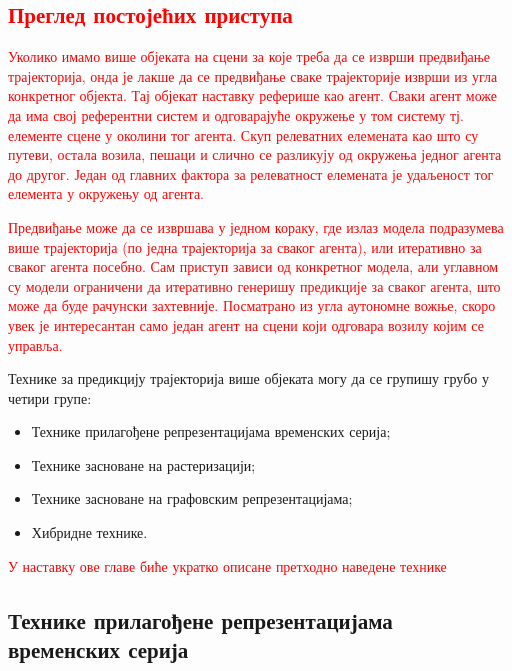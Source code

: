 \documentclass[11pt,oneside]{memoir}
\begin{document}
\textcolor{red}{\chapter{Преглед постојећих приступа}}
\label{chp:razrada}

\textcolor{red}{Уколико имамо више објеката на сцени за које треба да се изврши предвиђање трајекторија, онда је лакше да се предвиђање сваке 
трајекторије изврши из угла конкретног објекта. Тај објекат наставку реферише као агент. Сваки агент може да има свој референтни систем
и одговарајуће окружење у том систему тј. елементе сцене у околини тог агента. Скуп релеватних елемената као што су путеви, остала возила, пешаци и слично се
разликују од окружења једног агента до другог. Један од главних фактора за релеватност елемената је удаљеност тог елемента у окружењу од агента.}

\textcolor{red}{Предвиђање може да се извршава у једном кораку, где излаз модела подразумева више трајекторија (по једна трајекторија за сваког агента), 
или итеративно за сваког агента посебно. Сам приступ зависи од конкретног модела, 
али углавном су модели ограничени да итеративно генеришу предикције за сваког агента, што може да буде рачунски захтевније. 
Посматрано из угла аутономне вожње, скоро увек је интересантан само један агент на сцени који одговара возилу којим се управља.}

Технике за предикцију трајекторија више објеката могу да се групишу грубо у четири групе:
\begin{itemize}
  \item Технике прилагођене репрезентацијама временских серија;
  \item Технике засноване на растеризацији;
  \item Технике засноване на графовским репрезентацијама;
  \item Хибридне технике.
\end{itemize}

\textcolor{red}{У наставку ове главе биће укратко описане претходно наведене технике}

\section{Технике прилагођене репрезентацијама временских серија}
\end{document}
